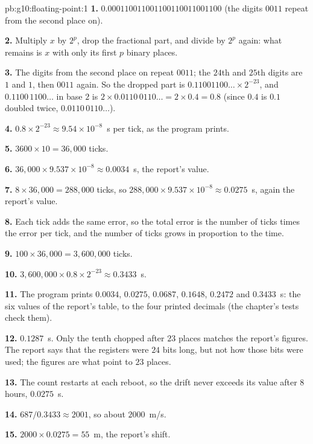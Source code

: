 \begin{solution}{pb:g10:floating-point:1}
\textbf{1.} $0.000110011001100110011001100$ (the digits $0011$ repeat from the second place on).

\textbf{2.} Multiply $x$ by $2^{p}$, drop the fractional part, and divide by $2^{p}$ again: what remains is $x$ with
only its first $p$ binary places.

\textbf{3.} The digits from the second place on repeat $0011$; the $24$th and $25$th digits are $1$ and $1$, then
$0011$ again. So the dropped part is $0.11001100\dots \times 2^{-23}$, and $0.1100\,1100\dots$ in base $2$ is
$2 \times 0.0110\,0110\dots = 2 \times 0.4 = 0.8$ (since $0.4$ is $0.1$ doubled twice, $0.0110\,0110\dots$).

\textbf{4.} $0.8 \times 2^{-23} \approx 9.54 \times 10^{-8}$~s per tick, as the program prints.

\textbf{5.} $3600 \times 10 = 36{,}000$ ticks.

\textbf{6.} $36{,}000 \times 9.537 \times 10^{-8} \approx 0.0034$~s, the report's value.

\textbf{7.} $8 \times 36{,}000 = 288{,}000$ ticks, so $288{,}000 \times 9.537 \times 10^{-8} \approx 0.0275$~s, again the
report's value.

\textbf{8.} Each tick adds the same error, so the total error is the number of ticks times the error per tick, and the
number of ticks grows in proportion to the time.

\textbf{9.} $100 \times 36{,}000 = 3{,}600{,}000$ ticks.

\textbf{10.} $3{,}600{,}000 \times 0.8 \times 2^{-23} \approx 0.3433$~s.

\textbf{11.} The program prints $0.0034$, $0.0275$, $0.0687$, $0.1648$, $0.2472$ and $0.3433$~s: the six values of the
report's table, to the four printed decimals (the chapter's tests check them).

\textbf{12.} $0.1287$~s. Only the tenth chopped after $23$ places matches the report's figures. The report says that the
registers were $24$ bits long, but not how those bits were used; the figures are what point to $23$ places.

\textbf{13.} The count restarts at each reboot, so the drift never exceeds its value after $8$ hours, $0.0275$~s.

\textbf{14.} $687 / 0.3433 \approx 2001$, so about $2000$~m/s.

\textbf{15.} $2000 \times 0.0275 = 55$~m, the report's shift.


\end{solution}
